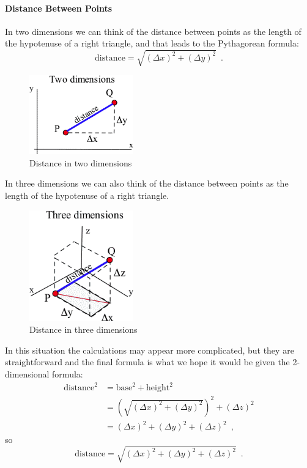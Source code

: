 \paragraph*{Distance Between Points}
In two dimensions we can think of the distance between points as the length of the hypotenuse of a right triangle, and that leads to the Pythagorean formula:
$$\mbox{distance} = \sqrt{(\Delta x)^2 + (\Delta y)^2 } \enspace .$$
\begin{figure}[!ht]
  \centering
    \includegraphics[width=0.4\textwidth]{img/chap4/image010.png}
    \caption{Distance in two dimensions}
    \label{fig:4-1-2dDist}
\end{figure}
In three dimensions we can also think of the distance between points as the length of the hypotenuse of a right triangle.

\begin{figure}[!ht]
  \centering
    \includegraphics[width=0.4\textwidth]{img/chap4/image011.png}
    \caption{Distance in three dimensions}
    \label{fig:4-1-3dDist}
\end{figure}
In this situation the calculations may appear more complicated, but they are straightforward and the final formula is what we hope it would be given the 2-dimensional formula:
\begin{align*}
    \mbox{distance}^2   &= \mbox{base}^2 + \mbox{height}^2 \\
                        &= \left(\sqrt{(\Delta x)^2 + (\Delta y)^2}\right)^2 + (\Delta z)^2\\
                        &= (\Delta x)^2 + (\Delta y)^2 + (\Delta z)^2 \enspace ,
\end{align*}
so
    $$\mbox{distance} = \sqrt{(\Delta x)^2 + (\Delta y)^2 + (\Delta z)^2} \enspace .$$

